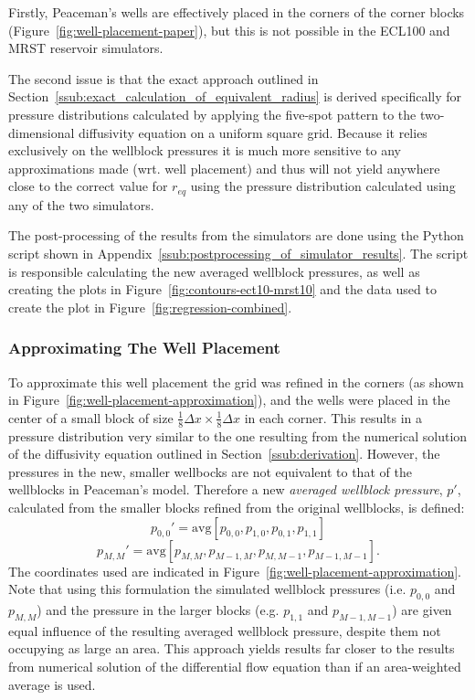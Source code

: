 Firstly, Peaceman's wells are effectively placed in the corners of the corner blocks (Figure~\ref{fig:well-placement-paper}), but this is not possible in the ECL100 and MRST reservoir simulators.

The second issue is that the exact approach outlined in Section~\ref{ssub:exact_calculation_of_equivalent_radius} is derived specifically for pressure distributions calculated by applying the five-spot pattern to the two-dimensional diffusivity equation on a uniform square grid. Because it relies exclusively on the wellblock pressures it is much more sensitive to any approximations made (wrt. well placement) and thus will not yield anywhere close to the correct value for $r_{eq}$ using the pressure distribution calculated using any of the two simulators.

The post-processing of the results from the simulators are done using the Python script shown in Appendix~\ref{ssub:postprocessing_of_simulator_results}. The script is responsible calculating the new averaged wellblock pressures, as well as creating the plots in Figure~\ref{fig:contours-ect10-mrst10} and the data used to create the plot in Figure~\ref{fig:regression-combined}.

\subsubsection{Approximating The Well Placement} %
\label{ssub:approximating_the_well_placement}

To approximate this well placement the grid was refined in the corners (as shown in Figure~\ref{fig:well-placement-approximation}), and the wells were placed in the center of a small block of size $\frac{1}{8}\Delta x\times \frac{1}{8}\Delta x$ in each corner. This results in a pressure distribution very similar to the one resulting from the numerical solution of the diffusivity equation outlined in Section~\ref{ssub:derivation}. However, the pressures in the new, smaller wellbocks are not equivalent to that of the wellblocks in Peaceman's model. Therefore a new \emph{averaged wellblock pressure}, $p'$, calculated from the smaller blocks refined from the original wellblocks, is defined:
\begin{equation}
    p_{0,0}' = \mathrm{avg}\left[ p_{0,0}, p_{1,0}, p_{0,1}, p_{1,1} \right]
\end{equation}
\begin{equation}
    p_{M,M}' = \mathrm{avg}\left[ p_{M,M}, p_{M-1,M}, p_{M,M-1}, p_{M-1,M-1} \right].
\end{equation}
The coordinates used are indicated in Figure~\ref{fig:well-placement-approximation}. Note that using this formulation the simulated wellblock pressures (i.e. $p_{0,0}$ and $p_{M,M}$) and the pressure in the larger blocks (e.g. $p_{1,1}$ and $p_{M-1,M-1}$) are given equal influence of the resulting averaged wellblock pressure, despite them not occupying as large an area.  This approach yields results far closer to the results from numerical solution of the differential flow equation than if an area-weighted average is used.


